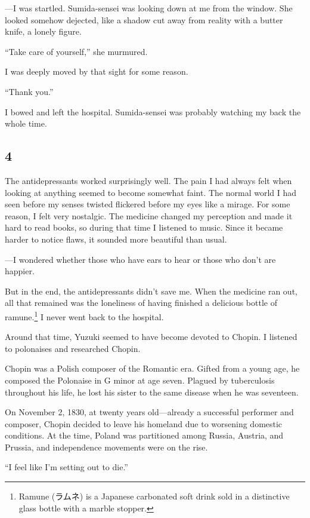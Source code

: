 \documentclass[
    a4paper,
    12pt,
    twoside,
    openany,
    UTF8,
    fontset=windows
]{ctexbook}
\begin{document}
---I was startled. Sumida-sensei was looking down at me from the window. She looked somehow dejected, like a shadow cut away from reality with a butter knife, a lonely figure.

``Take care of yourself,'' she murmured.

I was deeply moved by that sight for some reason.

``Thank you.''

I bowed and left the hospital. Sumida-sensei was probably watching my back the whole time.


\subsection*{4}

The antidepressants worked surprisingly well. The pain I had always felt when looking at anything seemed to become somewhat faint. The normal world I had seen before my senses twisted flickered before my eyes like a mirage. For some reason, I felt very nostalgic. The medicine changed my perception and made it hard to read books, so during that time I listened to music. Since it became harder to notice flaws, it sounded more beautiful than usual.

---I wondered whether those who have ears to hear or those who don't are happier.

But in the end, the antidepressants didn't save me. When the medicine ran out, all that remained was the loneliness of having finished a delicious bottle of ramune.\footnote{Ramune (ラムネ) is a Japanese carbonated soft drink sold in a distinctive glass bottle with a marble stopper.} I never went back to the hospital.

Around that time, Yuzuki seemed to have become devoted to Chopin. I listened to polonaises and researched Chopin.

Chopin was a Polish composer of the Romantic era. Gifted from a young age, he composed the Polonaise in G minor at age seven. Plagued by tuberculosis throughout his life, he lost his sister to the same disease when he was seventeen.

On November 2, 1830, at twenty years old---already a successful performer and composer, Chopin decided to leave his homeland due to worsening domestic conditions. At the time, Poland was partitioned among Russia, Austria, and Prussia, and independence movements were on the rise.

``I feel like I'm setting out to die.''
\end{document}
